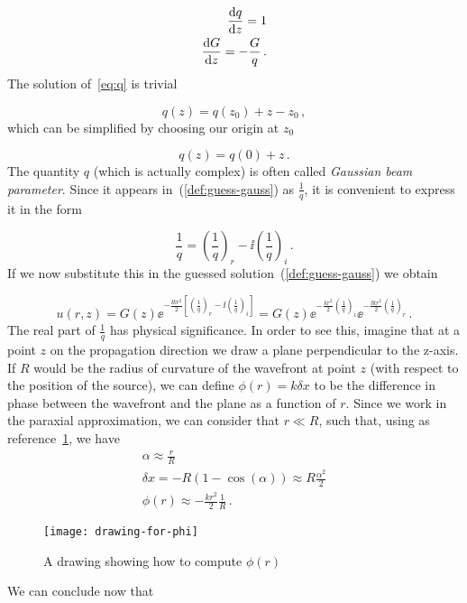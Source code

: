 \documentclass[12pt, class=report, crop=false]{standalone}
\begin{document}
\begin{subequations}
  \begin{align}
    \label{eq:q}
    \dv{q}{z} = 1 \\
    \label{eq:G}
    \dv{G}{z} = -\frac{G}{q} \,.
  \end{align}
\end{subequations}
The solution of~\cref{eq:q} is trivial

\begin{equation*}
  q(z) = q(z_0) + z - z_0 \,,
\end{equation*}
which can be simplified by choosing our origin at \(z_0\)

\begin{equation}
  \label{sol:q}
  q(z) = q (0)+z\,.
\end{equation}
The quantity \(q\) (which is actually complex) is often called \textit{Gaussian beam parameter}. Since it appears in~(\ref{def:guess-gauss}) as \(\frac{1}{q}\), it is convenient to express it in the form

\begin{equation}
  \frac{1}{q} = \left(\frac{1}{q} \right)_r - \ii \left(\frac{1}{q} \right)_i\,.
\end{equation}
If we now substitute this in the guessed solution~(\ref{def:guess-gauss}) we obtain

\begin{equation}
  u(r,z) = G(z) \ee^{- \frac{\ii k r^2}{2} \left[ \left(\frac{1}{q} \right)_r - \ii \left(\frac{1}{q} \right)_i \right]} = G(z) \ee^{-\frac{kr^2}{2} \left(\frac{1}{q} \right)_i} \ee^{- \frac{\ii k r^2}{2} \left(\frac{1}{q} \right)_r}\,.
\end{equation}
The real part of \(\frac{1}{q}\) has physical significance. In order to see this, imagine that at a point \(z\) on the propagation direction we draw a plane perpendicular to the z-axis. If \(R\) would be the radius of curvature of the wavefront at point \(z\) (with respect to the position of the source), we can define \(\phi(r) = k \delta x\) to be the difference in phase between the wavefront and the plane as a function of \(r\). Since we work in the paraxial approximation, we can consider that \(r\ll R\), such that, using as reference~\cref{fig:phi-of-r}, we have
\begin{subequations}
  \begin{align}
    \alpha \approx \frac{r}{R} \\
    \delta x = - R (1-\cos(\alpha)) \approx R \frac{\alpha^2}{2} \\
    \phi (r) \approx - \frac{k r^2}{2} \frac{1}{R}\,.
  \end{align}
\end{subequations}
\begin{figure}[h]
  \centering
  \texttt{[image: drawing-for-phi]}%
  \caption{A drawing showing how to compute \(\phi(r)\)}\label{fig:phi-of-r}%
\end{figure}
We can conclude now that
\end{document}
